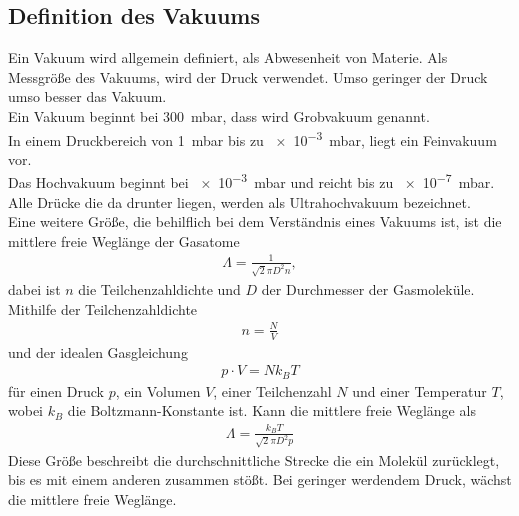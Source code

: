 \subsection{Definition des Vakuums}
Ein Vakuum wird allgemein definiert, als Abwesenheit von Materie.
Als Messgröße des Vakuums, wird der Druck verwendet. Umso geringer der Druck umso besser das Vakuum.\\
Ein Vakuum beginnt bei \SI{300}{\milli\bar}, dass wird Grobvakuum genannt.\\
In einem Druckbereich von \SI{1}{\milli\bar} bis zu \SI{e-3}{\milli\bar}, liegt ein Feinvakuum vor.\\
Das Hochvakuum beginnt bei \SI{e-3}{\milli\bar} und reicht bis zu \SI{e-7}{\milli\bar}. Alle Drücke die da drunter liegen, werden als Ultrahochvakuum bezeichnet.\\
Eine weitere Größe, die behilflich bei dem Verständnis eines Vakuums ist, ist die mittlere freie Weglänge der Gasatome
\begin{align}
\Lambda = \frac{1}{\sqrt{2}\pi D^2n},
\end{align}
dabei ist $n$ die Teilchenzahldichte und $D$ der Durchmesser der Gasmoleküle. Mithilfe der Teilchenzahldichte 
\begin{align}
n=\frac{N}{V}
\end{align}
und der idealen Gasgleichung
\begin{align}
p\cdot V = N k_B T \label{eq:IdealGas}
\end{align}
für einen Druck $p$, ein Volumen $V$, einer Teilchenzahl $N$ und einer Temperatur $T$, wobei $k_B$ die Boltzmann-Konstante ist.
Kann die mittlere freie Weglänge als
\begin{align}
\Lambda = \frac{k_BT}{\sqrt{2}\pi D^2p}
\end{align} 
Diese Größe beschreibt die durchschnittliche Strecke die ein Molekül zurücklegt, bis es mit einem anderen zusammen stößt. Bei geringer werdendem Druck, wächst die mittlere freie Weglänge.

